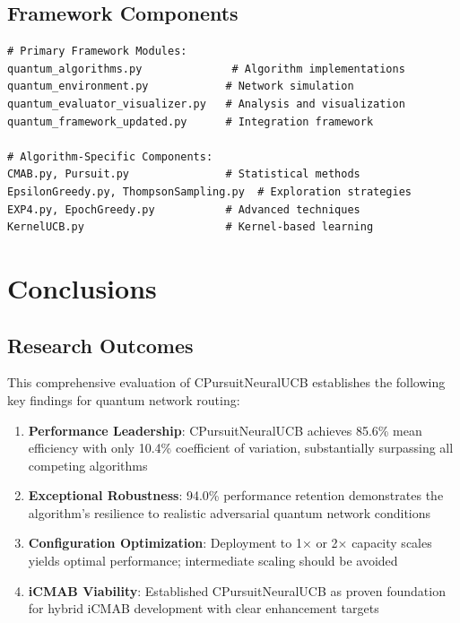 \documentclass[12pt,a4paper]{article}
\newcommand{\primarytext}[1]{\textcolor{primaryblue}{\textbf{#1}}}
\newcommand{\secondarytext}[1]{\textcolor{secondaryblue}{\textbf{#1}}}
\newcommand{\success}[1]{\textcolor{accentgreen}{\textbf{#1}}}
\begin{document}
\subsection{Framework Components}

\begin{lstlisting}[caption=Core Implementation Architecture]
# Primary Framework Modules:
quantum_algorithms.py              # Algorithm implementations
quantum_environment.py            # Network simulation
quantum_evaluator_visualizer.py   # Analysis and visualization
quantum_framework_updated.py      # Integration framework

# Algorithm-Specific Components:
CMAB.py, Pursuit.py               # Statistical methods
EpsilonGreedy.py, ThompsonSampling.py  # Exploration strategies
EXP4.py, EpochGreedy.py           # Advanced techniques
KernelUCB.py                      # Kernel-based learning
\end{lstlisting}

\newpage
\section{Conclusions}

\subsection{Research Outcomes}

This comprehensive evaluation of CPursuitNeuralUCB establishes the following key findings for quantum network routing:

\begin{enumerate}
\item \primarytext{Performance Leadership}: CPursuitNeuralUCB achieves 85.6\% mean efficiency with only 10.4\% coefficient of variation, substantially surpassing all competing algorithms
\item \success{Exceptional Robustness}: 94.0\% performance retention demonstrates the algorithm's resilience to realistic adversarial quantum network conditions
\item \secondarytext{Configuration Optimization}: Deployment to 1× or 2× capacity scales yields optimal performance; intermediate scaling should be avoided
\item \primarytext{iCMAB Viability}: Established CPursuitNeuralUCB as proven foundation for hybrid iCMAB development with clear enhancement targets
\end{enumerate}
\end{document}
